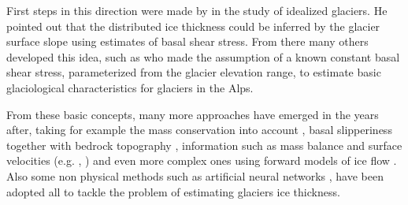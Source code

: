 First steps in this direction were made by \citet{Nye1965} in the study of  idealized glaciers. He pointed out that the distributed ice thickness could be inferred by the glacier surface slope using estimates of basal shear stress. From there many others developed this idea, such as \citet{haeberli1995} who made the assumption of a known constant basal shear stress, parameterized from the glacier elevation range, to estimate basic glaciological characteristics for glaciers in the Alps. 

From these basic concepts, many more approaches have emerged in the years after, taking for example the mass conservation into account \citep{rasmussen_1988}, basal slipperiness together with bedrock topography \citep{Gudmundsson2001}, information such as mass balance and surface velocities (e.g. \citealt{gantayat2014}, \citealt{brinkerhoff2016}) and even more complex ones using forward models of ice flow \citep{vanPelt2013}. Also some non physical methods such as artificial neural networks \citep{Clarke2009}, have been adopted all to tackle the problem of estimating glaciers ice thickness. 

